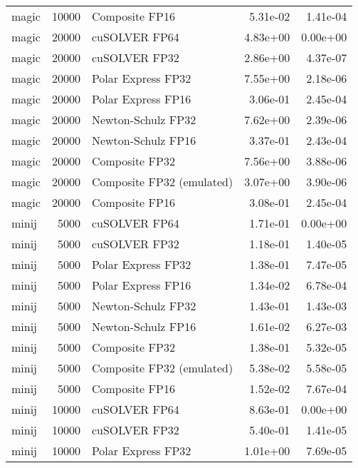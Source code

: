 \begin{table}
\begin{tabular}{lrlrr}
    magic & 10000 &            Composite FP16 &  5.31e-02 &        1.41e-04 \\
    magic & 20000 &             cuSOLVER FP64 &  4.83e+00 &        0.00e+00 \\
    magic & 20000 &             cuSOLVER FP32 &  2.86e+00 &        4.37e-07 \\
    magic & 20000 &        Polar Express FP32 &  7.55e+00 &        2.18e-06 \\
    magic & 20000 &        Polar Express FP16 &  3.06e-01 &        2.45e-04 \\
    magic & 20000 &        Newton-Schulz FP32 &  7.62e+00 &        2.39e-06 \\
    magic & 20000 &        Newton-Schulz FP16 &  3.37e-01 &        2.43e-04 \\
    magic & 20000 &            Composite FP32 &  7.56e+00 &        3.88e-06 \\
    magic & 20000 & Composite FP32 (emulated) &  3.07e+00 &        3.90e-06 \\
    magic & 20000 &            Composite FP16 &  3.08e-01 &        2.45e-04 \\
    minij &  5000 &             cuSOLVER FP64 &  1.71e-01 &        0.00e+00 \\
    minij &  5000 &             cuSOLVER FP32 &  1.18e-01 &        1.40e-05 \\
    minij &  5000 &        Polar Express FP32 &  1.38e-01 &        7.47e-05 \\
    minij &  5000 &        Polar Express FP16 &  1.34e-02 &        6.78e-04 \\
    minij &  5000 &        Newton-Schulz FP32 &  1.43e-01 &        1.43e-03 \\
    minij &  5000 &        Newton-Schulz FP16 &  1.61e-02 &        6.27e-03 \\
    minij &  5000 &            Composite FP32 &  1.38e-01 &        5.32e-05 \\
    minij &  5000 & Composite FP32 (emulated) &  5.38e-02 &        5.58e-05 \\
    minij &  5000 &            Composite FP16 &  1.52e-02 &        7.67e-04 \\
    minij & 10000 &             cuSOLVER FP64 &  8.63e-01 &        0.00e+00 \\
    minij & 10000 &             cuSOLVER FP32 &  5.40e-01 &        1.41e-05 \\
    minij & 10000 &        Polar Express FP32 &  1.01e+00 &        7.69e-05 \\

\end{tabular}
\end{table}
